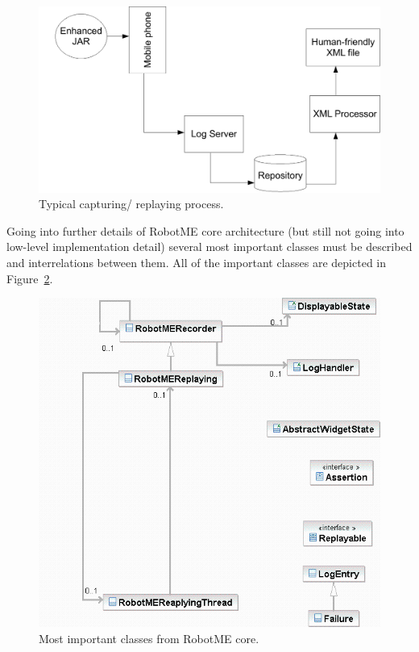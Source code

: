 \begin{figure}[t]%
\begin{center}
\includegraphics[width=.6\linewidth]{figures/diagram2}
\end{center}
\caption{Typical capturing/ replaying process.}%
\label{fig:diagram2}
\end{figure}

Going into further details of RobotME core architecture  (but still not going into
low-level implementation detail) several most important classes must be described and
interrelations between them. All of the important classes are depicted in 
Figure~\ref{fig:uml-diagram-1}.

\begin{figure}[p]%
\begin{center}
\includegraphics[width=\linewidth]{figures/uml-diagram-1}
\end{center}
\caption{Most important classes from RobotME core.}%
\label{fig:uml-diagram-1}
\end{figure}

